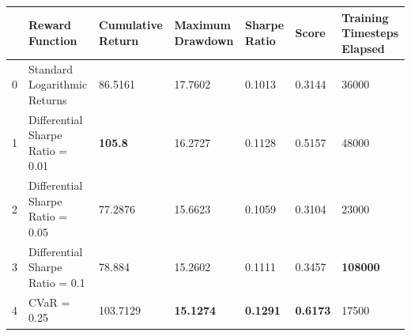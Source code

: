 \begin{tabular}{lllllll}
\toprule
 & Reward Function & Cumulative Return & Maximum Drawdown & Sharpe Ratio & Score & Training Timesteps Elapsed \\
\midrule
0 & Standard Logarithmic Returns & 86.5161 & 17.7602 & 0.1013 & 0.3144 & 36000 \\
1 & Differential Sharpe Ratio = 0.01 & \textbf{105.8} & 16.2727 & 0.1128 & 0.5157 & 48000 \\
2 & Differential Sharpe Ratio = 0.05 & 77.2876 & 15.6623 & 0.1059 & 0.3104 & 23000 \\
3 & Differential Sharpe Ratio = 0.1 & 78.884 & 15.2602 & 0.1111 & 0.3457 & \textbf{108000} \\
4 & CVaR = 0.25 & 103.7129 & \textbf{15.1274} & \textbf{0.1291} & \textbf{0.6173} & 17500 \\
\bottomrule
\end{tabular}
